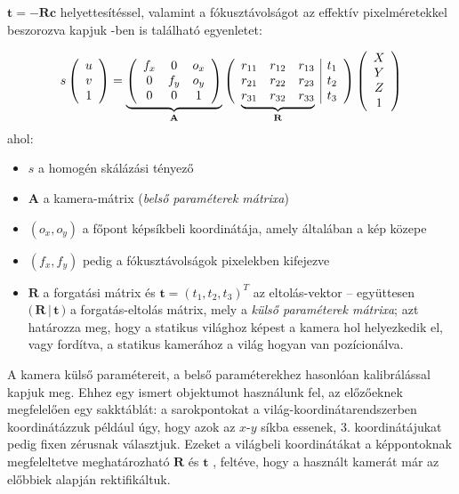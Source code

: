 $\mathbf{t} = -\mathbf{R}\mathbf{c}$ helyettesítéssel, valamint a fókusztávolságot az effektív pixelméretekkel beszorozva kapjuk \cite{camera-calib}-ben is található egyenletet:

\[s \left(\begin{array}{c}
u \\ 
v \\
1
\end{array}\right) = \underbrace{\left(\begin{array}{ccc}
f_x & 0 & o_x \\ 
0 & f_y & o_y \\
0 & 0 & 1
\end{array}\right)}_{\mathbf{A}} \left(\begin{array}{ccc|cc}
r_{11} & r_{12} & r_{13} & t_1 \\ 
r_{21} & r_{22} & r_{23} & t_2 \\
\undermat{\mathbf{R}}{r_{31} & r_{32} & r_{33}} & t_3 \\
\end{array}\right) \left(\begin{array}{c}
X \\ 
Y \\
Z \\
1
\end{array}\right)\]
ahol:
\begin{itemize}[itemsep=0pt]
\item $s$ a homogén skálázási tényező
\item $\mathbf{A}$ a kamera-mátrix (\textit{belső paraméterek mátrixa})
\item $(o_x, o_y)$ a főpont képsíkbeli koordinátája, amely általában a kép közepe
\item $(f_x, f_y)$ pedig a fókusztávolságok pixelekben kifejezve
\item $\mathbf{R}$ a forgatási mátrix és $\mathbf{t} = (t_1, t_2, t_3)^T$ az eltolás-vektor -- együttesen $\Big(\,\mathbf{R}\,|\,\mathbf{t}\,\Big)$ a forgatás-eltolás mátrix, mely a \textit{külső paraméterek mátrixa}; azt határozza meg, hogy a statikus világhoz képest a kamera hol helyezkedik el, vagy fordítva, a statikus kamerához a világ hogyan van pozícionálva.
\end{itemize}

A kamera külső paramétereit, a belső paraméterekhez hasonlóan kalibrálással kapjuk meg. Ehhez egy ismert objektumot használunk fel, az előzőeknek megfelelően egy sakktáblát: a sarokpontokat a világ-koordinátarend\-szerben koordinátázzuk például úgy, hogy azok az $x$-$y$ síkba essenek, 3. koordinátájukat pedig fixen zérusnak választjuk. Ezeket a világbeli koordinátákat a képpontoknak megfeleltetve meghatározható $\mathbf{R}$ és $\mathbf{t}$ \cite{camera-calib}, feltéve, hogy a használt kamerát már az előbbiek alapján rektifikáltuk.

